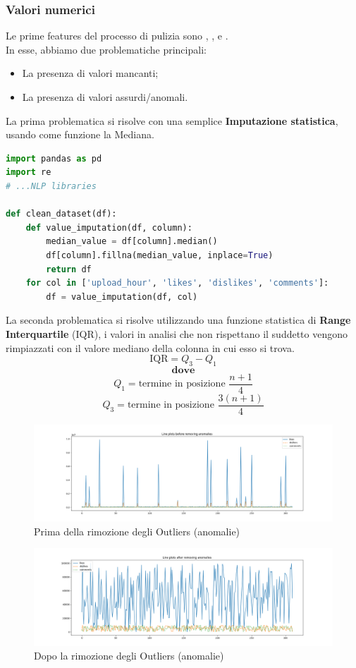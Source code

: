 \documentclass[a4paper,12pt]{report}
\begin{document}
\subsubsection{Valori numerici}
Le prime features del processo di pulizia sono \texttt{\color{red}{upload\_hour}}, \texttt{\color{red}{likes}}, \texttt{\color{red}{dislikes}} e \texttt{\color{red}{comments}}.\\
In esse, abbiamo due problematiche principali:
\begin{itemize}
        \item La presenza di valori mancanti;
        \item La presenza di valori assurdi/anomali.
\end{itemize}
La prima problematica si risolve con una semplice \textbf{Imputazione statistica}, usando come funzione la Mediana.
\begin{lstlisting}[language=Python]
import pandas as pd
import re
# ...NLP libraries

def clean_dataset(df):
    def value_imputation(df, column):
        median_value = df[column].median()
        df[column].fillna(median_value, inplace=True)
        return df
    for col in ['upload_hour', 'likes', 'dislikes', 'comments']:
        df = value_imputation(df, col)
\end{lstlisting}
La seconda problematica si risolve utilizzando una funzione statistica di \textbf{Range Interquartile} (IQR), i valori in analisi che non rispettano il suddetto vengono rimpiazzati con il valore mediano della colonna in cui esso si trova.
\\
\[
\text{IQR} = Q_3 - Q_1
\]
\[
\textbf{dove}
\]
\[
Q_1 = \text{termine in posizione } \frac{n + 1}{4}
\]
\[
Q_3 = \text{termine in posizione } \frac{3(n + 1)}{4}
\]
\begin{figure}[h]
\centering
\includegraphics[width=\textwidth]{before_IQR.png}
\caption{Prima della rimozione degli Outliers (anomalie)}
\end{figure}
\begin{figure}[h]
\centering
\includegraphics[width=\textwidth]{after_IQR.png}
\caption{Dopo la rimozione degli Outliers (anomalie)}
\end{figure}
\end{document}
